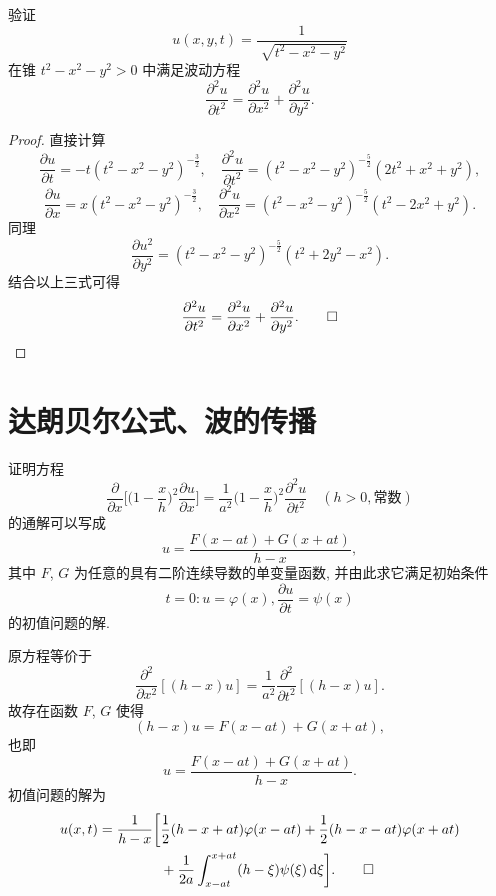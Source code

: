 \begin{exercise}
  验证
  \[u(x,y,t) = \frac{1}{\sqrt[]{t^2-x^2-y^2}}\]
  在锥 $t^2-x^2-y^2>0$ 中满足波动方程
  \[\frac{\partial^2 u}{\partial t^2}
    = \frac{\partial^2 u}{\partial x^2}
      + \frac{\partial^2 u}{\partial y^2}.\]
\end{exercise}

\begin{proof}
  直接计算
  \[\frac{\partial u}{\partial t}=-t(t^2-x^2-y^2)^{-\frac32},\quad
    \frac{\partial^2u}{\partial t^2}=(t^2-x^2-y^2)^{-\frac52}(2t^2+x^2+y^2),\]
  \[\frac{\partial u}{\partial x}=x(t^2-x^2-y^2)^{-\frac32},\quad
    \frac{\partial^2u}{\partial x^2}=(t^2-x^2-y^2)^{-\frac52}(t^2-2x^2+y^2).\]
  同理
  \[\frac{\partial u^2}{\partial y^2}=(t^2-x^2-y^2)^{-\frac52}(t^2+2y^2-x^2).\]
  结合以上三式可得
  \[\frac{\partial^2u}{\partial t^2}
    = \frac{\partial^2u}{\partial x^2}+\frac{\partial^2u}{\partial y^2}.\qedhere\]
\end{proof}


\section{达朗贝尔公式、波的传播}

\begin{exercise}
  证明方程
  \[\frac{\partial}{\partial x}\biggl[\biggl(1-\frac{x}{h}\biggr)^2
    \frac{\partial u}{\partial x}\biggr]
    = \frac{1}{a^2}\biggl(1-\frac{x}{h}\biggr)^2 \frac{\partial^2u}{\partial t^2}\quad(h>0,\text{常数})\]
  的通解可以写成
  \[u = \frac{F(x-at)+G(x+at)}{h-x},\]
  其中 $F$, $G$ 为任意的具有二阶连续导数的单变量函数, 并由此求它满足初始条件
  \[t=0: u = \varphi(x), \frac{\partial u}{\partial t} = \psi(x)\]
  的初值问题的解.
\end{exercise}

\begin{solve}
  原方程等价于
  \[\frac{\partial^2}{\partial x^2}[(h-x)u]
    = \frac{1}{a^2}\frac{\partial^2}{\partial t^2}[(h-x)u].\]
  故存在函数 $F$, $G$ 使得
  \[(h-x)u = F(x-at) + G(x+at),\]
  也即
  \[u = \frac{F(x-at)+G(x+at)}{h-x}.\]
  初值问题的解为
  \begin{align*}
    u(x,t)
     = \frac{1}{h-x}\biggl[
      & \frac12 (h-x+at)\varphi(x-at) + \frac12 (h-x-at)\varphi(x+at) \\
      & + \frac{1}{2a}\int_{x-at}^{x+at} (h-\xi)\psi(\xi)\mathop{}\!\mathrm{d}\xi\biggr]. \qedhere
  \end{align*}
\end{solve}


